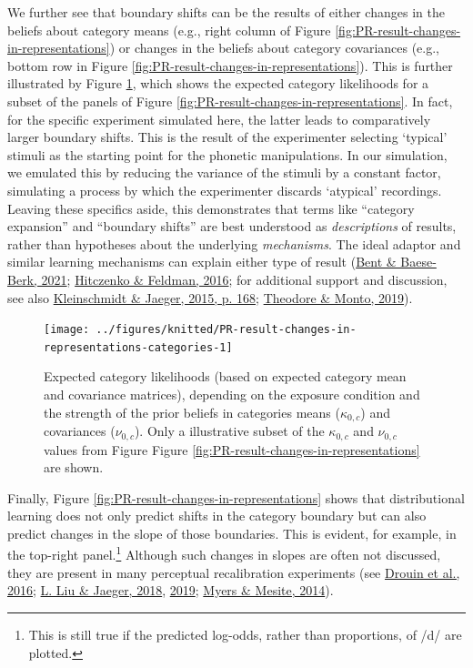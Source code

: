 \documentclass[
  11pt,
  man,floatsintext]{apa6}
\begin{document}
We further see that boundary shifts can be the results of either changes in the beliefs about category means (e.g., right column of Figure \ref{fig:PR-result-changes-in-representations}) or changes in the beliefs about category covariances (e.g., bottom row in Figure \ref{fig:PR-result-changes-in-representations}). This is further illustrated by Figure \ref{fig:PR-result-changes-in-representations-categories}, which shows the expected category likelihoods for a subset of the panels of Figure \ref{fig:PR-result-changes-in-representations}. In fact, for the specific experiment simulated here, the latter leads to comparatively larger boundary shifts. This is the result of the experimenter selecting `typical' stimuli as the starting point for the phonetic manipulations. In our simulation, we emulated this by reducing the variance of the stimuli by a constant factor, simulating a process by which the experimenter discards `atypical' recordings. Leaving these specifics aside, this demonstrates that terms like ``category expansion'' and ``boundary shifts'' are best understood as \emph{descriptions} of results, rather than hypotheses about the underlying \emph{mechanisms}. The ideal adaptor and similar learning mechanisms can explain either type of result (\protect\hyperlink{ref-bent-baeseberk2021}{Bent \& Baese-Berk, 2021}; \protect\hyperlink{ref-hitczenko-feldman2016}{Hitczenko \& Feldman, 2016}; for additional support and discussion, see also \protect\hyperlink{ref-kleinschmidt-jaeger2015}{Kleinschmidt \& Jaeger, 2015, p. 168}; \protect\hyperlink{ref-theodore-monto2019}{Theodore \& Monto, 2019}).



\begin{figure}

{\centering \texttt{[image: ../figures/knitted/PR-result-changes-in-representations-categories-1]} 

}

\caption{Expected category likelihoods (based on expected category mean and covariance matrices), depending on the exposure condition and the strength of the prior beliefs in categories means (\(\kappa_{0,c}\)) and covariances (\(\nu_{0,c}\)). Only a illustrative subset of the \(\kappa_{0,c}\) and \(\nu_{0,c}\) values from Figure Figure \ref{fig:PR-result-changes-in-representations} are shown.}\label{fig:PR-result-changes-in-representations-categories}
\end{figure}

Finally, Figure \ref{fig:PR-result-changes-in-representations} shows that distributional learning does not only predict shifts in the category boundary but can also predict changes in the slope of those boundaries. This is evident, for example, in the top-right panel.\footnote{This is still true if the predicted log-odds, rather than proportions, of /d/ are plotted.} Although such changes in slopes are often not discussed, they are present in many perceptual recalibration experiments (see \protect\hyperlink{ref-drouin2016}{Drouin et al., 2016}; \protect\hyperlink{ref-liu-jaeger2018}{L. Liu \& Jaeger, 2018}, \protect\hyperlink{ref-liu-jaeger2019}{2019}; \protect\hyperlink{ref-myers-mesite2014}{Myers \& Mesite, 2014}).
\end{document}
